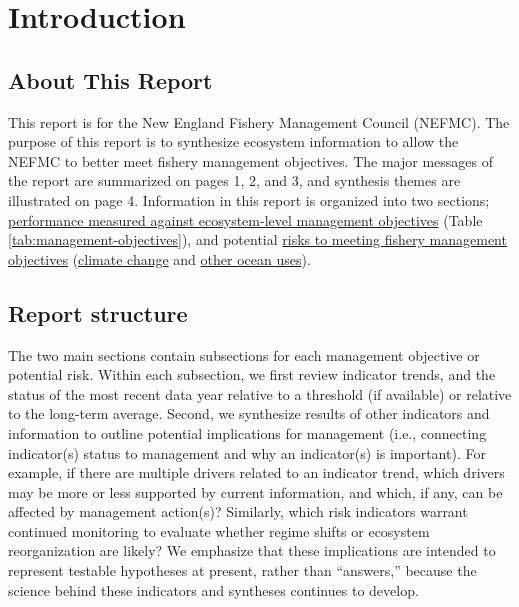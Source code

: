 \documentclass[
  10pt,
]{article}
\author{}
\date{\vspace{-2.5em}}
\begin{document}
\setcounter{page}{5}
\thispagestyle{fancy}

\hypertarget{introduction}{%
\section{Introduction}\label{introduction}}

\hypertarget{about-this-report}{%
\subsection{About This Report}\label{about-this-report}}

This report is for the New England Fishery Management Council (NEFMC). The purpose of this report is to synthesize ecosystem information to allow the NEFMC to better meet fishery management objectives. The major messages of the report are summarized on pages 1, 2, and 3, and synthesis themes are illustrated on page 4. Information in this report is organized into two sections; \protect\hyperlink{performance-relative-to-fishery-management-objectives}{performance measured against ecosystem-level management objectives} (Table \ref{tab:management-objectives}), and potential \protect\hyperlink{risks-to-meeting-fishery-management-objectives}{risks to meeting fishery management objectives} (\protect\hyperlink{climate-and-ecosystem-productivity}{climate change} and \protect\hyperlink{other-ocean-uses-offshore-wind}{other ocean uses}).

\hypertarget{report-structure}{%
\subsection{Report structure}\label{report-structure}}

The two main sections contain subsections for each management objective or potential risk. Within each subsection, we first review indicator trends, and the status of the most recent data year relative to a threshold (if available) or relative to the long-term average. Second, we synthesize results of other indicators and information to outline potential implications for management (i.e., connecting indicator(s) status to management and why an indicator(s) is important). For example, if there are multiple drivers related to an indicator trend, which drivers may be more or less supported by current information, and which, if any, can be affected by management action(s)? Similarly, which risk indicators warrant continued monitoring to evaluate whether regime shifts or ecosystem reorganization are likely? We emphasize that these implications are intended to represent testable hypotheses at present, rather than ``answers,'' because the science behind these indicators and syntheses continues to develop.
\end{document}
